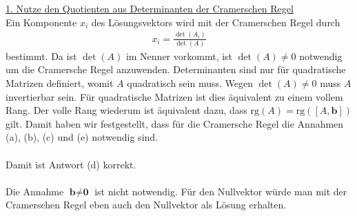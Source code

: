 \underline{1. Nutze den Quotienten aus Determinanten der Cramerschen Regel}\\
Ein Komponente $ x_i $ des Lösungsvektors wird mit der Cramerschen Regel durch
\begin{align*}
	x_i = \frac{\det(A_i)}{\det(A)}
\end{align*}
bestimmt. Da ist $ \det(A)  $ im Nenner vorkommt, ist $ \det(A) \neq 0 $ notwendig um die Cramersche Regel anzuwenden.
Determinanten sind nur für quadratische Matrizen definiert, womit $ A $ quadratisch sein muss.
Wegen $ \det(A) \neq 0 $ muss $ A $ invertierbar sein. Für quadratische Matrizen ist dies äquivalent zu einem vollem Rang. Der volle Rang wiederum ist äquivalent dazu, dass $ \mathrm{rg}(A) = \mathrm{rg}([A,\textbf{b}]) $ gilt.
Damit haben wir festgestellt, dass für die Cramersche Regel die Annahmen (a), (b), (c) und (e) notwendig sind.\\
\\
Damit ist Antwort (d) korrekt.\\
\\
Die Annahme $ \textbf{b} \neq \textbf{0} $ ist nicht notwendig. Für den Nullvektor würde man mit der Cramerschen Regel eben auch den Nullvektor als Lösung erhalten. 
\newpage

